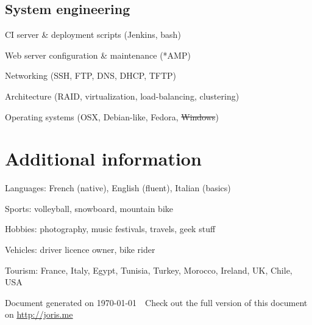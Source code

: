 \documentclass[letterpaper]{article}
\def\footerlink{http://joris.me}
\renewenvironment{itemize}{
    \begin{list}{}{
        \setlength{\leftmargin}{1.5em}
    }
}{
    \end{list}
}
\begin{document}
        \subsection*{System engineering}
            
            \begin{itemize}
                \item CI server \& deployment scripts (Jenkins, bash) 
                \item Web server configuration \& maintenance (*AMP)
                \item Networking (SSH, FTP, DNS, DHCP, TFTP)
                \item Architecture (RAID, virtualization, load-balancing, clustering)
                \item Operating systems (OSX, Debian-like, Fedora, \sout{Windows})
            \end{itemize}
            
    \section*{Additional information}
    
        \begin{itemize}
            \item Languages: French (native), English (fluent), Italian (basics)
            \item Sports: volleyball, snowboard, mountain bike
            \item Hobbies: photography, music festivals, travels, geek stuff
            \item Vehicles: driver licence owner, bike rider
            \item Tourism: France, Italy, Egypt, Tunisia, Turkey, Morocco, Ireland, UK, Chile, USA
        \end{itemize}
        
    \vfill
    
    \begin{center}
        \begin{footnotesize}
            Document generated on \today \ \textendash\ Check out the full version of this document on \uline{\href{\footerlink}{ \footerlink}}
        \end{footnotesize}
    \end{center}
\end{document}
